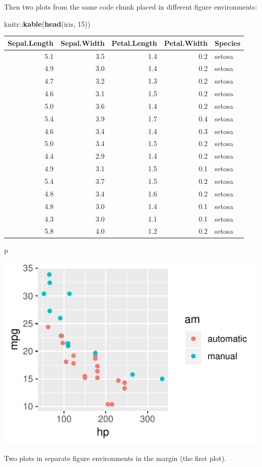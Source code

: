 \documentclass[]{tufte-handout}
\newenvironment{Shaded}{}{}
\newcommand{\KeywordTok}[1]{\textcolor[rgb]{0.00,0.44,0.13}{\textbf{#1}}}
\newcommand{\DecValTok}[1]{\textcolor[rgb]{0.25,0.63,0.44}{#1}}
\newcommand{\OperatorTok}[1]{\textcolor[rgb]{0.40,0.40,0.40}{#1}}
\newcommand{\NormalTok}[1]{#1}
\begin{document}
Then two plots from the same code chunk placed in different figure
environments:

\begin{Shaded}
\begin{Highlighting}[]
\NormalTok{knitr}\OperatorTok{::}\KeywordTok{kable}\NormalTok{(}\KeywordTok{head}\NormalTok{(iris, }\DecValTok{15}\NormalTok{))}
\end{Highlighting}
\end{Shaded}

\begin{longtable}[]{@{}rrrrl@{}}
\toprule
Sepal.Length & Sepal.Width & Petal.Length & Petal.Width &
Species\tabularnewline
\midrule
\endhead
5.1 & 3.5 & 1.4 & 0.2 & setosa\tabularnewline
4.9 & 3.0 & 1.4 & 0.2 & setosa\tabularnewline
4.7 & 3.2 & 1.3 & 0.2 & setosa\tabularnewline
4.6 & 3.1 & 1.5 & 0.2 & setosa\tabularnewline
5.0 & 3.6 & 1.4 & 0.2 & setosa\tabularnewline
5.4 & 3.9 & 1.7 & 0.4 & setosa\tabularnewline
4.6 & 3.4 & 1.4 & 0.3 & setosa\tabularnewline
5.0 & 3.4 & 1.5 & 0.2 & setosa\tabularnewline
4.4 & 2.9 & 1.4 & 0.2 & setosa\tabularnewline
4.9 & 3.1 & 1.5 & 0.1 & setosa\tabularnewline
5.4 & 3.7 & 1.5 & 0.2 & setosa\tabularnewline
4.8 & 3.4 & 1.6 & 0.2 & setosa\tabularnewline
4.8 & 3.0 & 1.4 & 0.1 & setosa\tabularnewline
4.3 & 3.0 & 1.1 & 0.1 & setosa\tabularnewline
5.8 & 4.0 & 1.2 & 0.2 & setosa\tabularnewline
\bottomrule
\end{longtable}

\begin{Shaded}
\begin{Highlighting}[]
\NormalTok{p}
\end{Highlighting}
\end{Shaded}

\begin{marginfigure}
\includegraphics{TufteExample_files/figure-latex/fig-margin-separate-1} \caption[Two plots in separate figure environments in the margin (the first plot)]{Two plots in separate figure environments in the margin (the first plot).}\label{fig:fig-margin-separate1}
\end{marginfigure}
\end{document}
